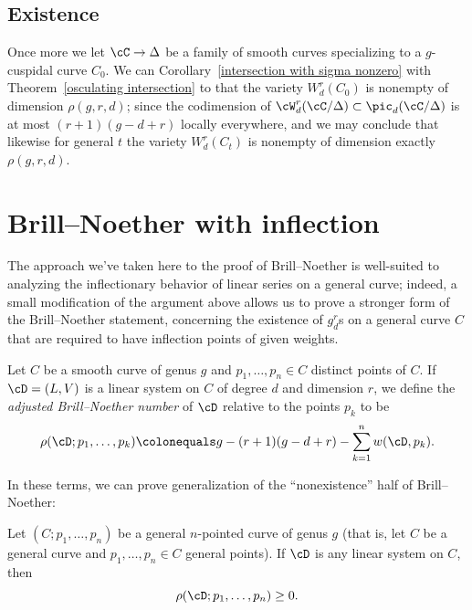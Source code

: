 \subsection*{Existence}

Once more we let $\cC \to \Delta$ be a family of smooth
curves specializing to a $g$-cuspidal curve $C_0$. We can 
Corollary~\ref{intersection with sigma nonzero} with
Theorem~\ref{osculating intersection} to 
that the variety $W^r_d(C_0)$
is nonempty of dimension $\rho(g,r,d)$; since the codimension of
$\cW^r_d(\cC/\Delta) \subset \pic_d(\cC/\Delta)$ is at most $(r+1)(g-d+r)$
locally everywhere, and we may conclude that likewise for general $t$
the variety $W^r_d(C_t)$ is nonempty of dimension exactly $\rho(g,r,d)$.

\section{Brill--Noether with inflection}

The approach we've taken here to the proof of Brill--Noether is
%
%
%
well-suited to analyzing the inflectionary behavior of linear series on a
general curve; indeed, a small modification of the argument above allows
us to prove a stronger form of the Brill--Noether statement, concerning
the existence of $g^r_d$s on a general curve $C$ that are required to
 have inflection points of given weights.

\begin{definition}
Let $C$ be a smooth curve of genus $g$ and $p_1,\dots,p_n \in C$ distinct
points of $C$. If $\cD = (L,V)$ is a linear system on $C$ of degree $d$
and dimension $r$, we define the \emph{adjusted Brill--Noether number}
%
of $\cD$ relative to the points $p_k$ to be
$$
\rho(\cD; p_1,\dots,p_k) \colonequals  g - (r+1)(g-d+r) - \sum_{k=1}^n
w(\cD,p_k).
$$
\end{definition}

In these terms, we can prove 
generalization of the
``nonexistence'' half of Brill--Noether:

\begin{theorem}\label{Brill--Noether with inflection}
Let $(C;p_1,\dots,p_n)$ be a general $n$-pointed curve of genus $g$
(that is, let $C$ be a general curve and $p_1,\dots,p_n \in C$ general
points). If $\cD$ is any linear system on $C$, then
$$
\rho(\cD; p_1,\dots,p_n) \geq 0.
$$
\end{theorem}

